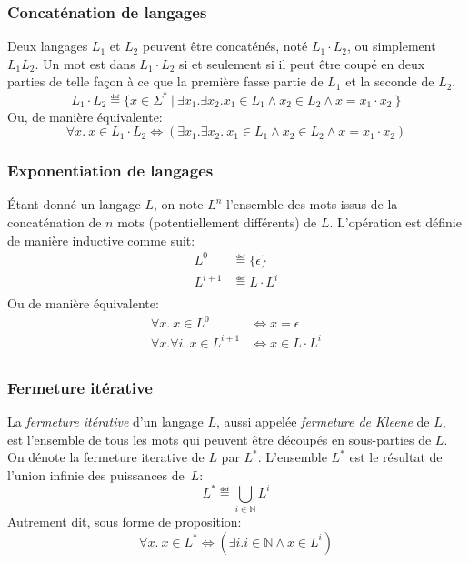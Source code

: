 \subsubsection{Concaténation de langages}

Deux langages $L_1$ et $L_2$ peuvent être concaténés, noté $L_1 \cdot L_2$, ou simplement $L_1L_2$.
Un mot est dans $L_1 \cdot L_2$ si et seulement si il peut être coupé en deux parties de telle façon à ce que la première fasse partie de $L_1$ et la seconde de $L_2$.
\[
L_1 \cdot L_2 \eqdef \{ x \in \Sigma^*\ |\ \exists x_1. \exists x_2. x_1 \in L_1 \wedge x_2 \in L_2 \wedge x = x_1 \cdot x_2\ \}
\]
Ou, de manière équivalente:
\[
\forall x.\ x \in L_1 \cdot L_2 \iff (\exists x_1. \exists x_2.\ x_1 \in L_1 \wedge x_2 \in L_2 \wedge x = x_1 \cdot x_2)
\]

\subsubsection{Exponentiation de langages}

Étant donné un langage $L$, on note $L^n$ l'ensemble des mots issus de la concaténation de $n$ mots (potentiellement différents) de $L$.
L'opération est définie de manière inductive comme suit:
\begin{align*}
L^0 &\eqdef \{ \epsilon \}\\
L^{i + 1} &\eqdef L \cdot L^i\\
\end{align*}
Ou de manière équivalente:
\begin{align*}
\forall x.\ x \in L^0 &\iff x = \epsilon\\
\forall x. \forall i.\ x \in L^{i + 1} &\iff x \in L \cdot L^i\\
\end{align*}

\subsubsection{Fermeture itérative}

La \og \textit{fermeture itérative} \fg{} d'un langage $L$, aussi appelée \og \textit{fermeture de Kleene} \fg{} de $L$, est l'ensemble de tous les mots qui peuvent être découpés en sous-parties de $L$. On dénote la fermeture iterative de $L$ par $L^*$.
L'ensemble $L^*$ est le résultat de l'union infinie des puissances de~$L$:
\[
L^* \eqdef \bigcup_{i \in \mathbb{N}} L^i
\]
Autrement dit, sous forme de proposition:
\[
\forall x.\ x \in L^* \iff (\exists i. i \in \mathbb{N} \wedge x \in L^i)
\]

